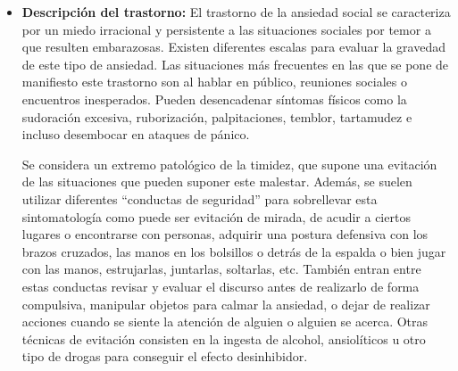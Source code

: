 \documentclass[12pt, a4paper,twoside,titlepage]{book}
\begin{document}
\begin{itemize}
    \item {\textbf{Descripción del trastorno:}
     El trastorno de la ansiedad social se caracteriza por un miedo irracional y persistente a las situaciones sociales por temor a que resulten embarazosas. Existen diferentes escalas para evaluar la gravedad de este tipo de ansiedad. Las situaciones más frecuentes en las que se pone de manifiesto este trastorno son al hablar en público, reuniones sociales o encuentros inesperados. Pueden desencadenar síntomas físicos como la sudoración excesiva, ruborización, palpitaciones, temblor, tartamudez e incluso desembocar en ataques de pánico. 
     
     Se considera un extremo patológico de la timidez, que supone una evitación de las situaciones que pueden suponer este malestar. Además, se suelen utilizar diferentes “conductas de seguridad” para sobrellevar esta sintomatología como puede ser evitación de mirada, de acudir a ciertos lugares o encontrarse con personas, adquirir una postura defensiva con los brazos cruzados, las manos en los bolsillos o detrás de la espalda o bien jugar con las manos, estrujarlas, juntarlas, soltarlas, etc. También entran entre estas conductas revisar y evaluar el discurso antes de realizarlo de forma compulsiva, manipular objetos para calmar la ansiedad, o dejar de realizar acciones cuando se siente la atención de alguien o alguien se acerca. Otras técnicas de evitación consisten en la ingesta de alcohol, ansiolíticos u otro tipo de drogas para conseguir el efecto desinhibidor.  
     
}
\end{itemize}
\end{document}
